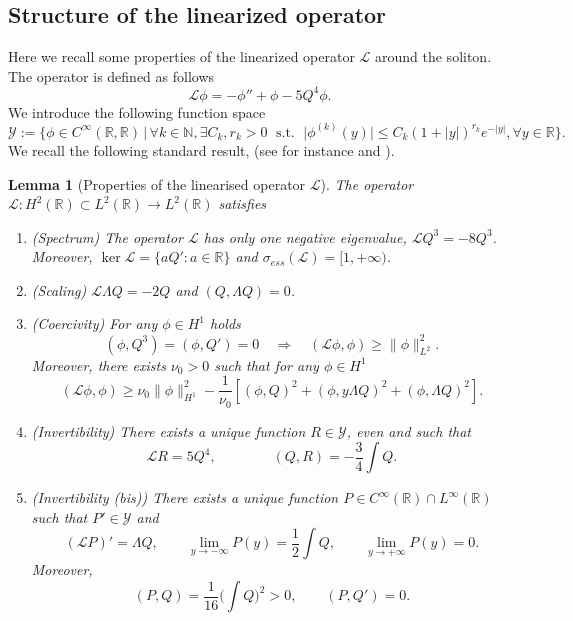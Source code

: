 \documentclass[16pt,english, oneside,reqno]{smfart}
\newcommand{\NN}{\mathbb{N}}
\newcommand{\RR}{\mathbb{R}}
\newtheorem{lemma}[theorem]{Lemma}
\begin{document}
\subsection{Structure of the linearized operator}
Here we recall some properties of the linearized operator $\mathcal{L}$ around the soliton. The operator is defined as follows
\begin{equation}
    \mathcal{L}\phi = -\phi'' +\phi - 5Q^4 \phi.
\end{equation}
We introduce the following function space
\begin{equation}
    \mathcal{Y} := \{\phi \in C^{\infty}(\RR,\RR) \,|\, \forall k \in \NN, \exists C_k, r_k>0 \;\text{ s.t. }\; \lvert \phi^{(k)}(y)\rvert\leq C_k(1+|y|)^{r_k}e^{-|y|}, \forall y \in \RR \}.
\end{equation}
We recall the following standard result, (see for instance \cite{Weinstein-85} and \cite{Martel-Merle-01}).
\begin{lemma}[Properties of the linearised operator $\mathcal{L}$]
The operator $\mathcal{L}: H^2(\RR) \subset L^2(\RR)\rightarrow L^2(\RR)$ satisfies
\begin{enumerate}
    \item (Spectrum) The operator $\mathcal{L}$ has only one negative eigenvalue, $\mathcal{L}Q^3 = -8 Q^3$. Moreover, $\ker{\mathcal{L}} = \{aQ' : a \in \RR \}$ and $\sigma_{ess}(\mathcal{L})=[1,+\infty)$.
    \item (Scaling) $\mathcal{L}\Lambda Q = -2Q$ and $(Q,\Lambda Q)=0 $.
    \item (Coercivity) For any $\phi \in H^1$ holds
    \begin{equation}
        (\phi, Q^3) = (\phi, Q') = 0  \quad\Rightarrow\quad (\mathcal{L}\phi,\phi)\geq \|\phi\|^2_{L^2}.
    \end{equation}
    Moreover, there exists $\nu_0>0$ such that for any $\phi\in H^1$
    \begin{equation}
        (\mathcal{L}\phi,\phi)\geq \nu_0\|\phi\|^2_{H^1}- \frac{1}{\nu_0}[(\phi,Q)^2 + (\phi, y\Lambda Q)^2 + (\phi, \Lambda Q)^2] .
    \end{equation}
    \item (Invertibility) There exists a unique function $R \in \mathcal{Y}$, even and such that 
    \begin{equation}\label{properties_of_R}
        \mathcal{L}R = 5Q^4, \qquad\qquad (Q,R) = -\frac{3}{4}\int Q.
    \end{equation}
    \item (Invertibility (bis))
    There exists a unique function $P \in C^{\infty}(\RR)\cap L^{\infty}(\RR)$ such that $P' \in \mathcal{Y}$ and 
    \begin{equation}
        (\mathcal{L}P)' = \Lambda Q, \qquad  \lim_{y \to -\infty}P(y) = \frac{1}{2}\int Q, \qquad \lim_{y\to+\infty}P(y)=0.
    \end{equation}
    Moreover,
    \begin{equation}\label{relation_on_scalar_prod_P_and_Q}
        (P,Q) = \frac{1}{16}\Big(\int Q \Big)^2>0,  \qquad (P,Q') = 0.
    \end{equation}
\end{enumerate}
\end{lemma}
\end{document}
